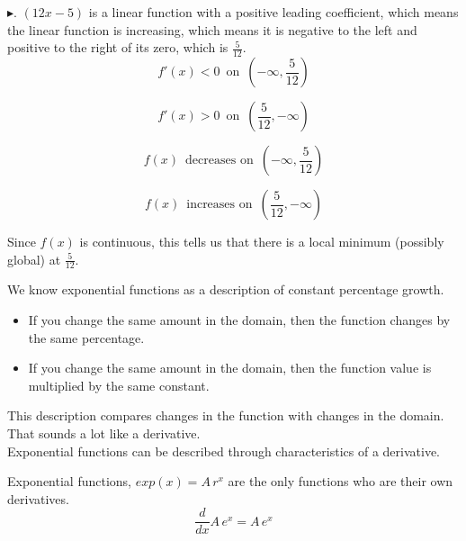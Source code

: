 \documentclass{ximera}
\begin{document}
\begin{example}
$\blacktriangleright$. $(12x - 5)$ is a linear function with a positive leading coefficient, which means the linear function is increasing, which means it is negative to the left and positive to the right of its zero, which is $\frac{5}{12}$. \\



\[
f'(x) < 0 \, \text{ on } \, \left( -\infty, \frac{5}{12} \right)
\]


\[
f'(x) > 0 \, \text{ on } \, \left( \frac{5}{12}, -\infty \right)
\]





\[
f(x)  \, \text{ decreases on } \, \left( -\infty, \frac{5}{12} \right)
\]


\[
f(x)  \, \text{ increases on } \, \left( \frac{5}{12}, -\infty \right)
\]



Since $f(x)$ is continuous, this tells us that there is a local minimum (possibly global) at $\frac{5}{12}$.


\end{example}






\begin{idea}


We know exponential functions as a description of constant percentage growth. 

\begin{itemize}
	\item If you change the same amount in the domain, then the function changes by the same percentage.
	\item If you change the same amount in the domain, then the function value is multiplied by the same constant.
\end{itemize}



This description compares changes in the function with changes in the domain. That sounds a lot like a derivative. \\

Exponential functions can be described through characteristics of a derivative.


\begin{center}

Exponential functions, $exp(x) = A \, r^x$ are the only functions who are their own derivatives. \\

\[
\frac{d}{dx} A \, e^x = A \, e^x
\]


\end{center}


\end{idea}
\end{document}
